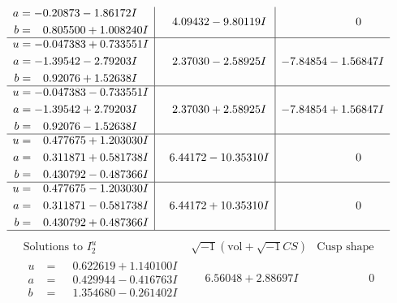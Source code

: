 \documentclass[1p]{elsarticle_modified}
\theoremstyle{definition}
\newcommand{\I}{\sqrt{-1}}
\begin{document}
$$\begin{array}{c|c|c}
\begin{aligned}
a &= -0.20873 - 1.86172 I \\
b &= \phantom{-}0.805500 + 1.008240 I\end{aligned}
 & \phantom{-}4.09432 - 9.80119 I & \phantom{-0.000000 } 0 \\ \hline\begin{aligned}
u &= -0.047383 + 0.733551 I \\
a &= -1.39542 - 2.79203 I \\
b &= \phantom{-}0.92076 + 1.52638 I\end{aligned}
 & \phantom{-}2.37030 - 2.58925 I & -7.84854 - 1.56847 I \\ \hline\begin{aligned}
u &= -0.047383 - 0.733551 I \\
a &= -1.39542 + 2.79203 I \\
b &= \phantom{-}0.92076 - 1.52638 I\end{aligned}
 & \phantom{-}2.37030 + 2.58925 I & -7.84854 + 1.56847 I \\ \hline\begin{aligned}
u &= \phantom{-}0.477675 + 1.203030 I \\
a &= \phantom{-}0.311871 + 0.581738 I \\
b &= \phantom{-}0.430792 - 0.487366 I\end{aligned}
 & \phantom{-}6.44172 - 10.35310 I & \phantom{-0.000000 } 0 \\ \hline\begin{aligned}
u &= \phantom{-}0.477675 - 1.203030 I \\
a &= \phantom{-}0.311871 - 0.581738 I \\
b &= \phantom{-}0.430792 + 0.487366 I\end{aligned}
 & \phantom{-}6.44172 + 10.35310 I & \phantom{-0.000000 } 0\\
 \hline 
 \end{array}$$\newpage$$\begin{array}{c|c|c}  
\text{Solutions to }I^u_{2}& \I (\text{vol} + \sqrt{-1}CS) & \text{Cusp shape}\\
 \hline 
\begin{aligned}
u &= \phantom{-}0.622619 + 1.140100 I \\
a &= \phantom{-}0.429944 - 0.416763 I \\
b &= \phantom{-}1.354680 - 0.261402 I\end{aligned}
 & \phantom{-}6.56048 + 2.88697 I & \phantom{-0.000000 } 0 \\ \hline\begin{aligned}

\end{aligned}
\end{array}$$
\end{document}
